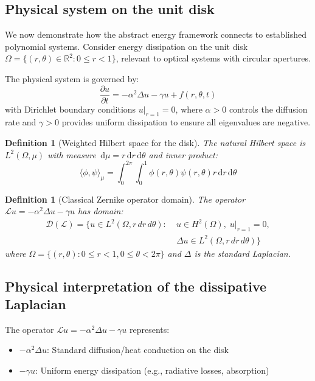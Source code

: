 \documentclass[a4paper,12pt]{article}
\newtheorem{definition}[theorem]{Definition}
\newcommand{\dd}{\,\mathrm{d}}
\def\R{\mathbb{R}}
\newcommand{\inner}[2]{\langle #1, #2 \rangle}
\begin{document}
\subsection{Physical system on the unit disk}

We now demonstrate how the abstract energy framework connects to established polynomial systems. Consider energy dissipation on the unit disk $\Omega = \{(r,\theta) \in \R^2 : 0 \leq r < 1\}$, relevant to optical systems with circular apertures.

The physical system is governed by:
\begin{equation}\label{eq:disk_evolution}
\frac{\partial u}{\partial t} = -\alpha^2 \Delta u - \gamma u + f(r,\theta,t)
\end{equation}
with Dirichlet boundary conditions $u|_{r=1} = 0$, where $\alpha > 0$ controls the diffusion rate and $\gamma > 0$ provides uniform dissipation to ensure all eigenvalues are negative.

\begin{definition}[Weighted Hilbert space for the disk]\label{def:disk_hilbert}
The natural Hilbert space is $L^2(\Omega, \mu)$ with measure $\dd\mu = r \dd r \dd\theta$ and inner product:
\begin{equation}
\inner{\phi}{\psi}_\mu = \int_0^{2\pi} \int_0^1 \phi(r,\theta) \psi(r,\theta) r \dd r \dd\theta
\end{equation}
\end{definition}

\begin{definition}[Classical Zernike operator domain]\label{def:disk_domain}
The operator $\mathcal{L}u = -\alpha^2 \Delta u - \gamma u$ has domain:
\begin{align}
\mathcal{D}(\mathcal{L}) = \{u \in L^2(\Omega, r\,dr\,d\theta) : &\; u \in H^2(\Omega), \; u|_{r=1} = 0,\\
&\; \Delta u \in L^2(\Omega, r\,dr\,d\theta)\}
\end{align}
where $\Omega = \{(r,\theta) : 0 \leq r < 1, 0 \leq \theta < 2\pi\}$ and $\Delta$ is the standard Laplacian.
\end{definition}

\subsection{Physical interpretation of the dissipative Laplacian}

The operator $\mathcal{L}u = -\alpha^2 \Delta u - \gamma u$ represents:
\begin{itemize}
\item $-\alpha^2 \Delta u$: Standard diffusion/heat conduction on the disk
\item $-\gamma u$: Uniform energy dissipation (e.g., radiative losses, absorption)
\end{itemize}
\end{document}
